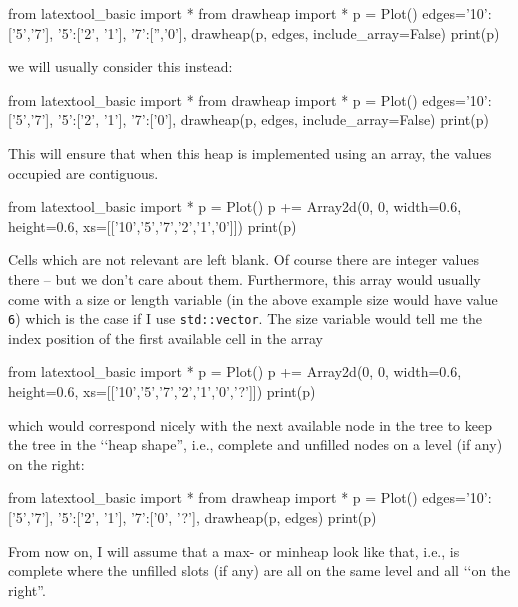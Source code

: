 \begin{python}
from latextool_basic import *
from drawheap import *
p = Plot()
edges={'10':['5','7'],
       '5':['2', '1'],
       '7':['','0'],
       }
drawheap(p, edges, include_array=False)
print(p)
\end{python}

we will usually consider this instead:

\begin{python}
from latextool_basic import *
from drawheap import *
p = Plot()
edges={'10':['5','7'],
       '5':['2', '1'],
       '7':['0'],
       }
drawheap(p, edges, include_array=False)
print(p)
\end{python}

This will ensure that when this heap is implemented
using an array, the values occupied are contiguous.

\begin{python}
from latextool_basic import *
p = Plot()
p += Array2d(0, 0, width=0.6, height=0.6, 
             xs=[['10','5','7','2','1','0']])
print(p)
\end{python}

Cells which are not relevant are left blank.
Of course there are integer values there --
but we don't care about them.
Furthermore, this array would usually come with a
size or length variable (in the above example size would have value
\texttt{6}) which is the case if I use
\verb!std::vector!.
The size variable would tell me the index position of
the first available cell in the array

\begin{python}
from latextool_basic import *
p = Plot()
p += Array2d(0, 0, width=0.6, height=0.6, 
             xs=[['10','5','7','2','1','0','?']])
print(p)
\end{python}

which would correspond nicely with the
next available node in the tree to keep the tree
in the \lq\lq heap shape'',
i.e., complete and unfilled nodes on a level
(if any) on the right:

\begin{python}
from latextool_basic import *
from drawheap import *  
p = Plot()
edges={'10':['5','7'],
       '5':['2', '1'],
       '7':['0', '?'],
       }
drawheap(p, edges)
print(p)
\end{python}

From now on, I will assume that a max- or minheap
look like that,
i.e., is complete where the unfilled slots (if any)
are all on the same level
and all \lq\lq on the right''.

